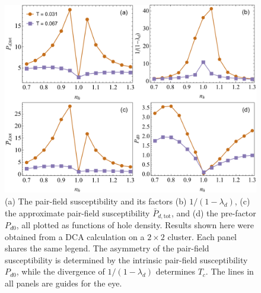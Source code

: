 \documentclass[reprint,nofootinbib,nobibnotes,amsmath,amssymb,aps,prb,floatfix]{revtex4-2}
\begin{document}
\begin{figure}[ht]
\centering
\includegraphics[width=0.8\linewidth]{2by2asymmetry.pdf}
\caption{(a) The pair-field susceptibility and its factors (b) $1/(1-\lambda_d)$, (c) the approximate pair-field susceptibility 
$\bar{P}_{d,\text{tot}}$, and (d) the pre-factor $P_{d0}$, all plotted 
as functions of hole density. Results shown here were obtained from a DCA calculation on a $2\times2$ cluster. Each panel shares the same legend. The asymmetry of the pair-field susceptibility is determined by the intrinsic pair-field susceptibility $P_{d0}$, while the divergence of $1/(1-\lambda_d)$ determines $T_c$. The lines in all panels are guides for the eye.
}
\label{Pddopedepend}
\end{figure}
\end{document}
